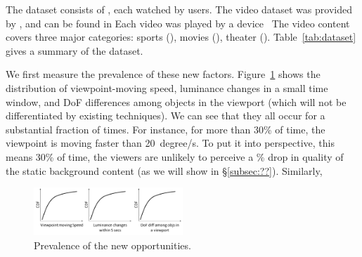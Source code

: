 The dataset consists of \fillme \vrvideos, each watched by \fillme users.
The video dataset was provided by \fillme{}, and can be found in \fillme {}
Each video was played by a \fillme device~\cite{??}
The video content covers three major categories: sports (\fillme), movies (\fillme), theater (\fillme).
Table~\ref{tab:dataset} gives a summary of the dataset.

We first measure the prevalence of these new factors. 
Figure~\ref{fig:prevalence} shows the distribution of viewpoint-moving speed, luminance changes in a small time window, and DoF differences among objects in the viewport (which will not be differentiated by existing techniques).
We can see that they all occur for a substantial fraction of times. 
For instance, for more than 30\% of time, the viewpoint is moving faster than 20~degree/s. 
To put it into perspective, this means 30\% of time, the viewers are unlikely to perceive a \fillme\% drop in quality of the static background content (as we will show in \S\ref{subsec:??}).
Similarly, 



\begin{figure}
  \centering
  \includegraphics[width=0.5\textwidth]{figures/prevalence.pdf}
  \caption{Prevalence of the new opportunities.}
  \label{fig:prevalence}
 \end{figure}



